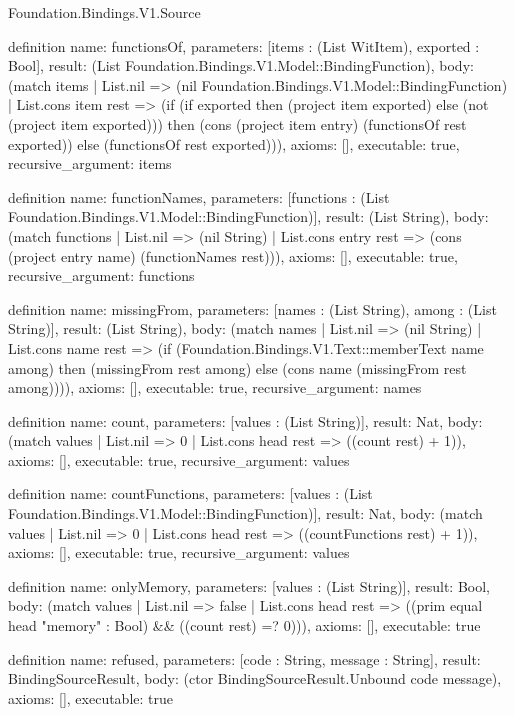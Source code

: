 \begin{lexlean}{Foundation.Bindings.V1.Source}
\begin{semanticmodule}
definition{
  name: functionsOf,
  parameters: [items : (List WitItem), exported : Bool],
  result: (List Foundation.Bindings.V1.Model::BindingFunction),
  body: (match items
    | List.nil => (nil Foundation.Bindings.V1.Model::BindingFunction)
    | List.cons item rest => (if (if exported then (project item exported) else (not (project item exported))) then (cons (project item entry) (functionsOf rest exported)) else (functionsOf rest exported))),
  axioms: [],
  executable: true,
  recursive_argument: items
}

definition{
  name: functionNames,
  parameters: [functions : (List Foundation.Bindings.V1.Model::BindingFunction)],
  result: (List String),
  body: (match functions
    | List.nil => (nil String)
    | List.cons entry rest => (cons (project entry name) (functionNames rest))),
  axioms: [],
  executable: true,
  recursive_argument: functions
}

definition{
  name: missingFrom,
  parameters: [names : (List String), among : (List String)],
  result: (List String),
  body: (match names
    | List.nil => (nil String)
    | List.cons name rest => (if (Foundation.Bindings.V1.Text::memberText name among) then (missingFrom rest among) else (cons name (missingFrom rest among)))),
  axioms: [],
  executable: true,
  recursive_argument: names
}

definition{
  name: count,
  parameters: [values : (List String)],
  result: Nat,
  body: (match values | List.nil => 0 | List.cons head rest => ((count rest) + 1)),
  axioms: [],
  executable: true,
  recursive_argument: values
}

definition{
  name: countFunctions,
  parameters: [values : (List Foundation.Bindings.V1.Model::BindingFunction)],
  result: Nat,
  body: (match values | List.nil => 0 | List.cons head rest => ((countFunctions rest) + 1)),
  axioms: [],
  executable: true,
  recursive_argument: values
}

definition{
  name: onlyMemory,
  parameters: [values : (List String)],
  result: Bool,
  body: (match values
    | List.nil => false
    | List.cons head rest => ((prim equal head "memory" : Bool) && ((count rest) =? 0))),
  axioms: [],
  executable: true
}

definition{
  name: refused,
  parameters: [code : String, message : String],
  result: BindingSourceResult,
  body: (ctor BindingSourceResult.Unbound code message),
  axioms: [],
  executable: true
}


\end{semanticmodule}
\end{lexlean}
